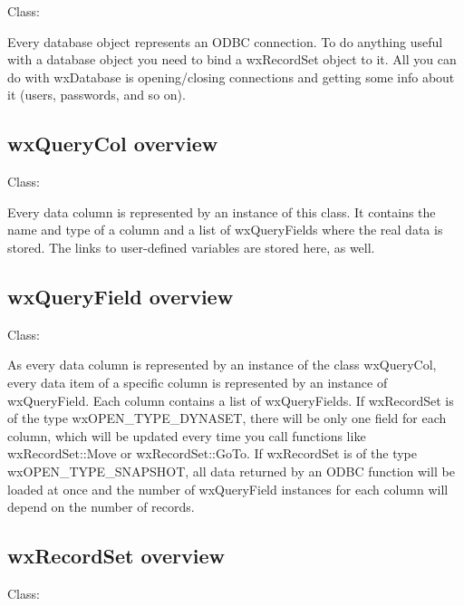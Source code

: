 Class: 

Every database object represents an ODBC connection. To do anything useful
with a database object you need to bind a wxRecordSet object to it. All you
can do with wxDatabase is opening/closing connections and getting some info
about it (users, passwords, and so on).

\subsection{wxQueryCol overview}\label{wxquerycoloverview}


Class: 

Every data column is represented by an instance of this class.
It contains the name and type of a column and a list of wxQueryFields where
the real data is stored. The links to user-defined variables are stored
here, as well.

\subsection{wxQueryField overview}\label{wxqueryfieldoverview}


Class: 

As every data column is represented by an instance of the class wxQueryCol,
every data item of a specific column is represented by an instance of
wxQueryField. Each column contains a list of wxQueryFields. If wxRecordSet is
of the type wxOPEN\_TYPE\_DYNASET, there will be only one field for each column,
which will be updated every time you call functions like wxRecordSet::Move
or wxRecordSet::GoTo. If wxRecordSet is of the type wxOPEN\_TYPE\_SNAPSHOT,
all data returned by an ODBC function will be loaded at once and the number
of wxQueryField instances for each column will depend on the number of records.

\subsection{wxRecordSet overview}\label{wxrecordsetoverview}


Class: 

